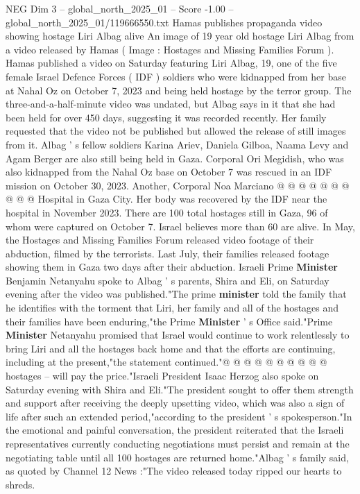 \begin{textsample}{NEG Dim 3 – global\_north\_2025\_01 – Score -1.00 – global\_north\_2025\_01/119666550.txt}  \label{ex:f3_neg_191}
Hamas publishes propaganda video showing hostage Liri Albag alive An image of 19 year old hostage Liri Albag from a video released by Hamas ( Image : Hostages and Missing Families Forum ).
Hamas published a video on Saturday featuring Liri Albag, 19, one of the five female Israel Defence Forces ( IDF ) soldiers who were kidnapped from her base at Nahal Oz on October 7, 2023 and being held hostage by the terror group.
The three-and-a-half-minute video was undated, but Albag says in it that she had been held for over 450 days, suggesting it was recorded recently.
Her family requested that the video not be published but allowed the release of still images from it.
Albag ' s fellow soldiers Karina Ariev, Daniela Gilboa, Naama Levy and Agam Berger are also still being held in Gaza.
Corporal Ori Megidish, who was also kidnapped from the Nahal Oz base on October 7 was rescued in an IDF mission on October 30, 2023.
Another, Corporal Noa Marciano @ @ @ @ @ @ @ @ @ @ Hospital in Gaza City.
Her body was recovered by the IDF near the hospital in November 2023.
There are 100 total hostages still in Gaza, 96 of whom were captured on October 7.
Israel believes more than 60 are alive.
In May, the Hostages and Missing Families Forum released video footage of their abduction, filmed by the terrorists.
Last July, their families released footage showing them in Gaza two days after their abduction.
Israeli Prime \textbf{Minister} Benjamin Netanyahu spoke to Albag ' s parents, Shira and Eli, on Saturday evening after the video was published."The prime \textbf{minister} told the family that he identifies with the torment that Liri, her family and all of the hostages and their families have been enduring,"the Prime \textbf{Minister} ' s Office said."Prime \textbf{Minister} Netanyahu promised that Israel would continue to work relentlessly to bring Liri and all the hostages back home and that the efforts are continuing, including at the present,"the statement continued."@ @ @ @ @ @ @ @ @ @ hostages -- will pay the price."Israeli President Isaac Herzog also spoke on Saturday evening with Shira and Eli."The president sought to offer them strength and support after receiving the deeply upsetting video, which was also a sign of life after such an extended period,"according to the president ' s spokesperson."In the emotional and painful conversation, the president reiterated that the Israeli representatives currently conducting negotiations must persist and remain at the negotiating table until all 100 hostages are returned home."Albag ' s family said, as quoted by Channel 12 News :"The video released today ripped our hearts to shreds.

\end{textsample}
